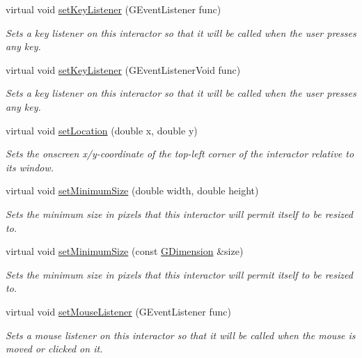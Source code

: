 \begin{DoxyCompactItemize}
virtual void \mbox{\hyperlink{classGInteractor_aeb8324d3287fa1fbe093f4d6230cf0a6}{set\+Key\+Listener}} (G\+Event\+Listener func)
\begin{DoxyCompactList}\small\item\em Sets a key listener on this interactor so that it will be called when the user presses any key. \end{DoxyCompactList}\item 
virtual void \mbox{\hyperlink{classGInteractor_ae48ecea73606c7bd9423e1c7cc589cc9}{set\+Key\+Listener}} (G\+Event\+Listener\+Void func)
\begin{DoxyCompactList}\small\item\em Sets a key listener on this interactor so that it will be called when the user presses any key. \end{DoxyCompactList}\item 
virtual void \mbox{\hyperlink{classGInteractor_a04594e8ba9b98513a64f1da00dcae18c}{set\+Location}} (double x, double y)
\begin{DoxyCompactList}\small\item\em Sets the onscreen x/y-\/coordinate of the top-\/left corner of the interactor relative to its window. \end{DoxyCompactList}\item 
virtual void \mbox{\hyperlink{classGInteractor_a0cf428e207b7f22cc08138a90b1b87b2}{set\+Minimum\+Size}} (double width, double height)
\begin{DoxyCompactList}\small\item\em Sets the minimum size in pixels that this interactor will permit itself to be resized to. \end{DoxyCompactList}\item 
virtual void \mbox{\hyperlink{classGInteractor_a3b1046117ac6cb7abe467e00ba8a81f4}{set\+Minimum\+Size}} (const \mbox{\hyperlink{structGDimension}{G\+Dimension}} \&size)
\begin{DoxyCompactList}\small\item\em Sets the minimum size in pixels that this interactor will permit itself to be resized to. \end{DoxyCompactList}\item 
virtual void \mbox{\hyperlink{classGInteractor_a37d8dbc943f59920f705b0104f60bde2}{set\+Mouse\+Listener}} (G\+Event\+Listener func)
\begin{DoxyCompactList}\small\item\em Sets a mouse listener on this interactor so that it will be called when the mouse is moved or clicked on it. \end{DoxyCompactList}\item 

\end{DoxyCompactItemize}
